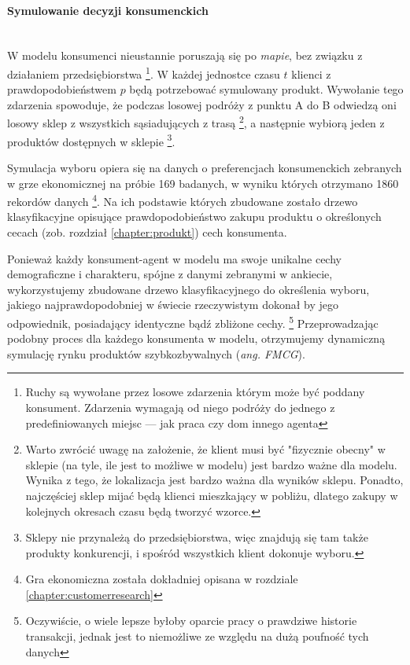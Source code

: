 \documentclass[polish, twoside, 12pt, a4paper]{article}
\theoremstyle{definition}
\theoremstyle{plain}
\theoremstyle{remark}
\begin{document}
\paragraph{Symulowanie decyzji konsumenckich}\mbox{}\\

W modelu konsumenci nieustannie poruszają się po \textit{mapie}, bez związku z działaniem przedsiębiorstwa \footnote{Ruchy są wywołane przez losowe zdarzenia którym może być poddany konsument. Zdarzenia wymagają od niego podróży do jednego z predefiniowanych miejsc --- jak praca czy dom innego agenta}. W każdej jednostce czasu $ t $ klienci z prawdopodobieństwem $ p $ będą potrzebować symulowany produkt. Wywołanie tego zdarzenia spowoduje, że podczas losowej podróży z punktu A do B odwiedzą oni losowy sklep z wszystkich sąsiadujących z trasą \footnote{Warto zwrócić uwagę na założenie, że klient musi być "fizycznie obecny" w sklepie (na tyle, ile jest to możliwe w modelu) jest bardzo ważne dla modelu. Wynika z tego, że lokalizacja jest bardzo ważna dla wyników sklepu. Ponadto, najczęściej sklep mijać będą klienci mieszkający w pobliżu, dlatego zakupy w kolejnych okresach czasu będą tworzyć wzorce.}, a następnie wybiorą jeden z produktów dostępnych w sklepie \footnote{Sklepy nie przynależą do przedsiębiorstwa, więc znajdują się tam także produkty konkurencji, i spośród wszystkich klient dokonuje wyboru.}. 

Symulacja wyboru opiera się na danych o preferencjach konsumenckich zebranych w grze ekonomicznej na próbie 169 badanych, w wyniku których otrzymano 1860 rekordów danych \footnote{Gra ekonomiczna została dokładniej opisana w rozdziale \ref{chapter:customerresearch}}. Na ich podstawie których zbudowane zostało drzewo klasyfikacyjne opisujące prawdopodobieństwo zakupu produktu o określonych cecach (zob. rozdział \ref{chapter:produkt}) cech konsumenta. 

Ponieważ każdy konsument-agent w modelu ma swoje unikalne cechy demograficzne i charakteru, spójne z danymi zebranymi w ankiecie, wykorzystujemy zbudowane drzewo klasyfikacyjnego do określenia wyboru, jakiego najprawdopodobniej w świecie rzeczywistym dokonał by jego odpowiednik, posiadający identyczne bądź zbliżone cechy. \footnote{Oczywiście, o wiele lepsze byłoby oparcie pracy o prawdziwe historie transakcji, jednak jest to niemożliwe ze względu na dużą poufność tych danych} Przeprowadzając podobny proces dla każdego konsumenta w modelu, otrzymujemy dynamiczną symulację rynku produktów szybkozbywalnych (\textit{ang. FMCG}).
\end{document}

